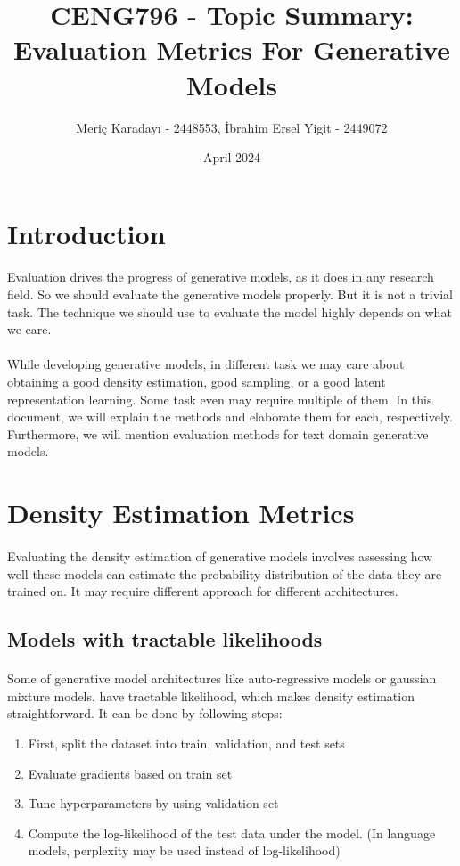 \documentclass{article}
\title{CENG796 - Topic Summary: \\ Evaluation Metrics For Generative Models}
\author{Meriç Karadayı - 2448553, İbrahim Ersel Yigit - 2449072}
\date{April 2024}
\begin{document}
\maketitle

\tableofcontents
\newpage

\section{Introduction}
\paragraph{}
Evaluation drives the progress of generative models, as it does in any research field. So we should evaluate the generative models properly. But it is not a trivial task. The technique we should use to evaluate the model highly depends on what we care.
\paragraph{}
While developing generative models, in different task we may care about obtaining a good density estimation, good sampling, or a good latent representation learning. Some task even may require multiple of them. In this document, we will explain the methods and elaborate them for each, respectively. Furthermore, we will mention evaluation methods for text domain generative models.

\section{Density Estimation Metrics}
    \paragraph{}
    Evaluating the density estimation of generative models involves assessing how well these models can estimate the probability distribution of the data they are trained on. It may require different approach for different architectures.
    \subsection{Models with tractable likelihoods}
    \paragraph{}
    Some of generative model architectures like auto-regressive models or gaussian mixture models, have tractable likelihood, which makes density estimation straightforward. It can be done by following steps:
    \begin{enumerate}
        \item First, split the dataset into train, validation, and test sets
        \item Evaluate gradients based on train set
        \item Tune hyperparameters by using validation set
        \item Compute the log-likelihood of the test data under the model. (In language models, perplexity may be used instead of log-likelihood)
    \end{enumerate}
\end{document}
